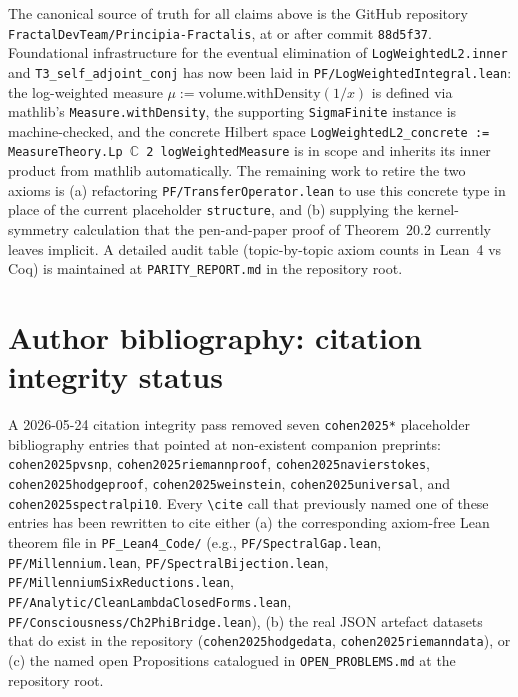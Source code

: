 The canonical source of truth for all claims above is the GitHub repository
\texttt{FractalDevTeam/Principia-Fractalis}, at or after commit \texttt{88d5f37}.
Foundational infrastructure for the eventual elimination of
\texttt{LogWeightedL2.inner} and \texttt{T3\_self\_adjoint\_conj} has now been laid
in \texttt{PF/LogWeightedIntegral.lean}: the log-weighted measure
$\mu := \mathrm{volume.withDensity}(1/x)$ is defined via mathlib's
\texttt{Measure.withDensity}, the supporting \texttt{SigmaFinite} instance is
machine-checked, and the concrete Hilbert space
\texttt{LogWeightedL2\_concrete := MeasureTheory.Lp $\mathbb{C}$ 2 logWeightedMeasure}
is in scope and inherits its inner product from mathlib automatically. The remaining
work to retire the two axioms is (a) refactoring \texttt{PF/TransferOperator.lean}
to use this concrete type in place of the current placeholder \texttt{structure},
and (b) supplying the kernel-symmetry calculation that the pen-and-paper proof of
Theorem~20.2 currently leaves implicit.
A detailed audit table (topic-by-topic axiom counts in Lean~4 vs Coq)
is maintained at \texttt{PARITY\_REPORT.md} in the repository root.

\section*{Author bibliography: citation integrity status}\label{sec:cohen2025-bib-status}
A 2026-05-24 citation integrity pass removed seven \texttt{cohen2025*}
placeholder bibliography entries that pointed at non-existent companion
preprints: \texttt{cohen2025pvsnp}, \texttt{cohen2025riemannproof},
\texttt{cohen2025navierstokes}, \texttt{cohen2025hodgeproof},
\texttt{cohen2025weinstein}, \texttt{cohen2025universal}, and
\texttt{cohen2025spectralpi10}. Every \texttt{\textbackslash cite} call
that previously named one of these entries has been rewritten to cite
either (a) the corresponding axiom-free Lean theorem file in
\texttt{PF\_Lean4\_Code/} (e.g., \texttt{PF/SpectralGap.lean},
\texttt{PF/Millennium.lean}, \texttt{PF/SpectralBijection.lean},
\texttt{PF/MillenniumSixReductions.lean},
\texttt{PF/Analytic/CleanLambdaClosedForms.lean},
\texttt{PF/Consciousness/Ch2PhiBridge.lean}), (b) the real JSON
artefact datasets that do exist in the repository
(\texttt{cohen2025hodgedata}, \texttt{cohen2025riemanndata}), or
(c) the named open Propositions catalogued in
\texttt{OPEN\_PROBLEMS.md} at the repository root.


